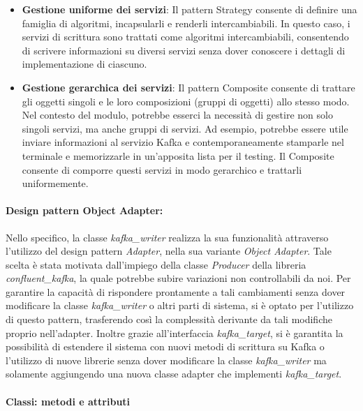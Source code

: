 \begin{itemize}
    \item \textbf{Gestione uniforme dei servizi}: Il pattern Strategy consente di definire una famiglia di algoritmi, incapsularli e renderli intercambiabili. In questo caso, i servizi di scrittura sono trattati come algoritmi intercambiabili, consentendo di scrivere informazioni su diversi servizi senza dover conoscere i dettagli di implementazione di ciascuno.
    \item \textbf{Gestione gerarchica dei servizi}: Il pattern Composite consente di trattare gli oggetti singoli e le loro composizioni (gruppi di oggetti) allo stesso modo. \\
    Nel contesto del modulo, potrebbe esserci la necessità di gestire non solo singoli servizi, ma anche gruppi di servizi. Ad esempio, potrebbe essere utile inviare informazioni al servizio Kafka e contemporaneamente stamparle nel terminale e memorizzarle in un'apposita lista per il testing. Il Composite consente di comporre questi servizi in modo gerarchico e trattarli uniformemente.
\end{itemize}

\paragraph{Design pattern Object Adapter:}
Nello specifico, la classe \textit{kafka\_writer} realizza la sua funzionalità attraverso l'utilizzo del design pattern \textit{Adapter}, nella sua variante \textit{Object Adapter}. Tale scelta è stata motivata dall'impiego della classe \textit{Producer} della libreria \textit{confluent\_kafka}, la quale potrebbe subire variazioni non controllabili da noi. Per garantire la capacità di rispondere prontamente a tali cambiamenti senza dover modificare la classe \textit{kafka\_writer} o altri parti di sistema, si è optato per l'utilizzo di questo pattern, trasferendo così la complessità derivante da tali modifiche proprio nell'adapter.
Inoltre grazie all'interfaccia \textit{kafka\_target}, si è garantita la possibilità di estendere il sistema con nuovi metodi di scrittura su Kafka o l'utilizzo di nuove librerie senza dover modificare la classe \textit{kafka\_writer} ma solamente aggiungendo una nuova classe adapter che implementi \textit{kafka\_target}.

\paragraph{Classi: metodi e attributi}

